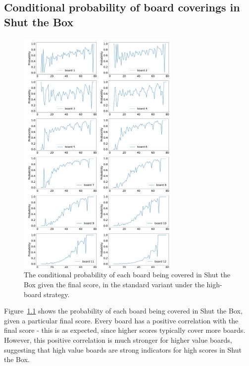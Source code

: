\documentclass{l4proj}
\theoremstyle{definition}
\begin{document}
\begin{appendices}

\chapter{Conditional probability of board coverings in Shut the Box}
\label{app:cond_prob_figure}


\begin{figure}[!h]
\centering
    \includegraphics[width=0.7\textwidth]{images/ShutTheBox/stb12_2d6_score_given_board_12.pdf}
    \caption{The conditional probability of each board being covered in Shut the Box given the final score, in the standard variant under the high-board strategy.}
\label{cs1:stb12_2d6_cond_prob}
\end{figure}

Figure~\ref{cs1:stb12_2d6_cond_prob} shows the probability of each board being covered in Shut the Box, given a particular final score. Every board has a positive correlation with the final score - this is as expected, since higher scores typically cover more boards. However, this positive correlation is much stronger for higher value boards, suggesting that high value boards are strong indicators for high scores in Shut the Box.

\end{appendices}






\end{document}
